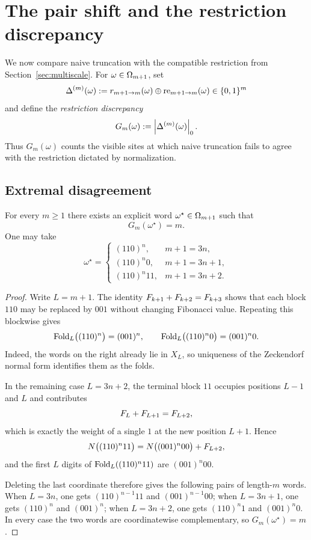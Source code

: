 \section{The pair shift and the restriction discrepancy}
\label{sec:gauge}

We now compare naive truncation with the compatible restriction from Section~\ref{sec:multiscale}. For \(\omega\in\Omega_{m+1}\), set
\[
\Delta^{(m)}(\omega)
:=
r_{m+1\to m}(\omega)\oplus \mathrm{re}_{m+1\to m}(\omega)\in \{0,1\}^m
\]
and define the \emph{restriction discrepancy}
\begin{equation}\label{eq:gauge-anomaly}
G_m(\omega):=\left|\Delta^{(m)}(\omega)\right|_0.
\end{equation}
Thus \(G_m(\omega)\) counts the visible sites at which naive truncation fails to agree with the restriction dictated by normalization.

\subsection{Extremal disagreement}

\begin{proposition}\label{prop:worst}
For every \(m\ge 1\) there exists an explicit word \(\omega^\star\in \Omega_{m+1}\) such that
\[
G_m(\omega^\star)=m.
\]
One may take
\[
\omega^\star=
\begin{cases}
(110)^n, & m+1=3n,\\
(110)^n0, & m+1=3n+1,\\
(110)^n11, & m+1=3n+2.
\end{cases}
\]
\end{proposition}

\begin{proof}
Write \(L=m+1\). The identity \(F_{k+1}+F_{k+2}=F_{k+3}\) shows that each block \(110\) may be replaced by \(001\) without changing Fibonacci value. Repeating this blockwise gives
\[
\mathrm{Fold}_L\bigl((110)^n\bigr)=(001)^n,
\qquad
\mathrm{Fold}_L\bigl((110)^n0\bigr)=(001)^n0.
\]
Indeed, the words on the right already lie in \(X_L\), so uniqueness of the Zeckendorf normal form identifies them as the folds.

In the remaining case \(L=3n+2\), the terminal block \(11\) occupies positions \(L-1\) and \(L\) and contributes
\[
F_L+F_{L+1}=F_{L+2},
\]
which is exactly the weight of a single \(1\) at the new position \(L+1\). Hence
\[
N\bigl((110)^n11\bigr)=N\bigl((001)^n00\bigr)+F_{L+2},
\]
and the first \(L\) digits of \(\mathrm{Fold}_L((110)^n11)\) are \((001)^n00\).

Deleting the last coordinate therefore gives the following pairs of length-\(m\) words. When \(L=3n\), one gets \((110)^{n-1}11\) and \((001)^{n-1}00\); when \(L=3n+1\), one gets \((110)^n\) and \((001)^n\); when \(L=3n+2\), one gets \((110)^n1\) and \((001)^n0\). In every case the two words are coordinatewise complementary, so \(G_m(\omega^\star)=m\).
\end{proof}

